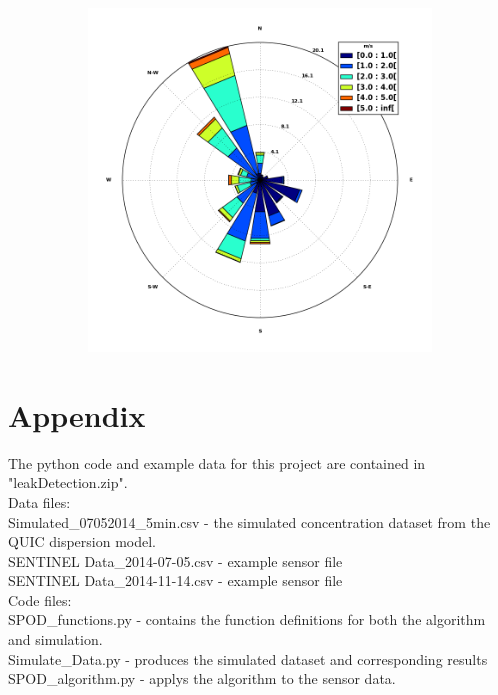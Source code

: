 \documentclass[fontsize=11pt]{scrartcl} %
\begin{document}
\begin{figure}[h!]
\begin{subfigure}[b]{0.3\textwidth}
	\end{subfigure}
	\begin{subfigure}[b]{0.3\textwidth}		
		\includegraphics[width=\linewidth]{windrose_None}
	\end{subfigure}
\end{figure}

\newpage 




\newpage
\section{Appendix}
The python code and example data for this project  are contained in "leakDetection.zip". \\
Data files: \\   
Simulated\_07052014\_5min.csv - the simulated concentration dataset from the QUIC dispersion model.\\ 
SENTINEL Data\_2014-07-05.csv - example sensor file\\
SENTINEL Data\_2014-11-14.csv - example sensor file\\
Code files: \\
SPOD\_functions.py - contains the function definitions for both the algorithm and simulation.\\
Simulate\_Data.py - produces the simulated dataset and corresponding results\\
SPOD\_algorithm.py - applys the algorithm to the sensor data.
\end{document}
